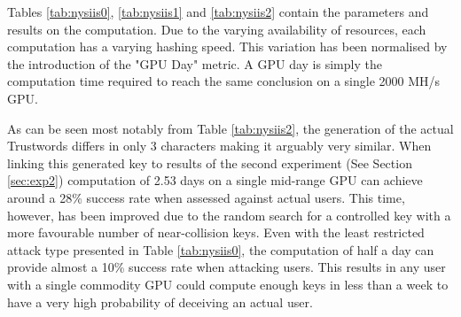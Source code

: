 Tables \ref{tab:nysiis0}, \ref{tab:nysiis1} and \ref{tab:nysiis2} contain the parameters and results on the computation. Due to the varying availability of resources, each computation has a varying hashing speed. This variation has been normalised by the introduction of the "GPU Day" metric. A GPU day is simply the computation time required to reach the same conclusion on a single 2000 MH/s GPU. 

As can be seen most notably from Table \ref{tab:nysiis2}, the generation of the actual Trustwords differs in only 3 characters making it arguably very similar. When linking this generated key to results of the second experiment (See Section \ref{sec:exp2}) computation of 2.53 days on a single mid-range GPU can achieve around a 28\% success rate when assessed against actual users. This time, however, has been improved due to the random search for a controlled key with a more favourable number of near-collision keys. Even with the least restricted attack type presented in Table \ref{tab:nysiis0}, the computation of half a day can provide almost a 10\% success rate when attacking users. This results in any user with a single commodity GPU could compute enough keys in less than a week to have a very high probability of deceiving an actual user.
